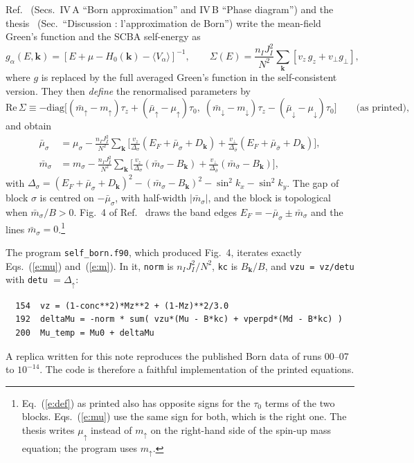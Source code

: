 \documentclass[11pt,a4paper]{article}
\newcommand{\up}{{\uparrow}}
\newcommand{\dn}{{\downarrow}}
\begin{document}
Ref.~\cite{g2g1} (Secs.~IV\,A ``Born approximation'' and IV\,B ``Phase diagram'') and the
thesis~\cite{thesis} (Sec.\ ``Discussion : l'approximation de Born'') write the mean-field Green's function and the SCBA self-energy as
\begin{equation}
g_\alpha(E,\bm k) = \left[E+\mu-H_0(\bm k)-\langle V_\alpha\rangle\right]^{-1},\qquad
\Sigma(E) = \frac{n_I J_I^2}{N^2}\sum_{\bm k}\left[v_z\, g_z + v_\perp g_\perp\right],
\label{e:sigma}
\end{equation}
where $g$ is replaced by the full averaged Green's function in the self-consistent version. They
then \emph{define} the renormalised parameters by
\begin{equation}
\mathrm{Re}\,\Sigma \equiv -\mathrm{diag}\big[(\bar m_\up-m_\up)\tau_z+(\bar\mu_\up-\mu_\up)\tau_0,\;
(\bar m_\dn-m_\dn)\tau_z-(\bar\mu_\dn-\mu_\dn)\tau_0\big]
\qquad\text{(as printed)},
\label{e:def}
\end{equation}
and obtain
\begin{align}
\bar\mu_\sigma &= \mu_\sigma - \frac{n_I J_I^2}{N^2}\sum_{\bm k}\Big[\frac{v_z}{\Delta_\sigma}(E_F+\bar\mu_\sigma+D_{\bm k})
 + \frac{v_\perp}{\Delta_{\bar\sigma}}(E_F+\bar\mu_{\bar\sigma}+D_{\bm k})\Big],\label{e:mu}\\
\bar m_\sigma &= m_\sigma - \frac{n_I J_I^2}{N^2}\sum_{\bm k}\Big[\frac{v_z}{\Delta_\sigma}(\bar m_\sigma-B_{\bm k})
 + \frac{v_\perp}{\Delta_{\bar\sigma}}(\bar m_{\bar\sigma}-B_{\bm k})\Big],\label{e:m}
\end{align}
with $\Delta_\sigma = (E_F+\bar\mu_\sigma+D_{\bm k})^2-(\bar m_\sigma-B_{\bm k})^2-\sin^2k_x-\sin^2k_y$. The
gap of block $\sigma$ is centred on $-\bar\mu_\sigma$, with half-width $|\bar m_\sigma|$, and the block
is topological when $\bar m_\sigma/B>0$. Fig.~4 of Ref.~\cite{g2g1} draws the band edges
$E_F=-\bar\mu_\sigma\pm\bar m_\sigma$ and the lines $\bar m_\sigma=0$.\footnote{Eq.~(\ref{e:def}) as
printed also has opposite signs for the $\tau_0$ terms of the two blocks. Eqs.~(\ref{e:mu}) use
the same sign for both, which is the right one. The thesis writes $\mu_\up$ instead of $m_\up$
on the right-hand side of the spin-up mass equation; the program uses $m_\up$.}

The program \texttt{self\_born.f90}, which produced Fig.~4, iterates exactly
Eqs.~(\ref{e:mu}) and~(\ref{e:m}). In it, \texttt{norm} is $n_I J_I^2/N^2$, \texttt{kc} is
$B_{\bm k}/B$, and \texttt{vzu = vz/detu} with \texttt{detu} $=\Delta_\up$:
\begin{verbatim}
  154  vz = (1-conc**2)*Mz**2 + (1-Mz)**2/3.0
  192  deltaMu = -norm * sum( vzu*(Mu - B*kc) + vperpd*(Md - B*kc) )
  200  Mu_temp = Mu0 + deltaMu
\end{verbatim}
A replica written for this note reproduces the published Born data of runs 00--07 to
$10^{-14}$. The code is therefore a faithful implementation of the printed equations.
\end{document}
